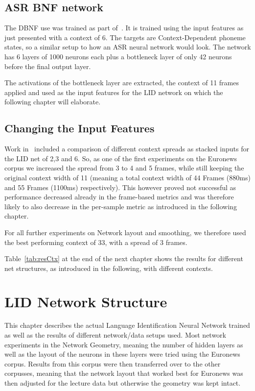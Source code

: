 \section{ASR BNF network}
\label{sec:FP:Net}

The DBNF use was trained as part of~\cite{Mueller2016b}. It is trained using the input features as just presented with a context of 6. The targets are Context-Dependent phoneme states, so a similar setup to how an ASR neural network would look. The network has 6 layers of 1000 neurons each plus a bottleneck layer of only 42 neurons before the final output layer. 

The activations of the bottleneck layer are extracted, the context of 11 frames applied and used as the input features for the LID network on which the following chapter will elaborate.


\section{Changing the Input Features}
\label{sec:LIDNetwork:Input}

Work in~\cite{Mueller2016b} included a comparison of different context spreads as stacked inputs for the LID net of 2,3 and 6. So, as one of the first experiments on the Euronews corpus we increased the spread from 3 to 4 and 5 frames, while still keeping the original context width of 11 (meaning a total context width of 44 Frames (880ms) and 55 Frames (1100ms) respectively). This however proved not successful as performance decreased already in the frame-based metrics and was therefore likely to also decrease in the per-sample metric as introduced in the following chapter. 

For all further experiments on Network layout and smoothing, we therefore used the best performing context of 33, with a spread of 3 frames.

Table~\ref{tab:resCtx} at the end of the next chapter shows the results for different net structures, as introduced in the following, with different contexts.

\chapter{LID Network Structure}
\label{ch:LIDNetwork}

This chapter describes the actual Language Identification Neural Network trained as well as the results of different network/data setups used. Most network experiments in the Network Geometry, meaning the number of hidden layers as well as the layout of the neurons in these layers were tried using the Euronews corpus. Results from this corpus were then transferred over to the other corpusses, meaning that the network layout that worked best for Euronews was then adjusted for the lecture data but otherwise the geometry was kept intact.

